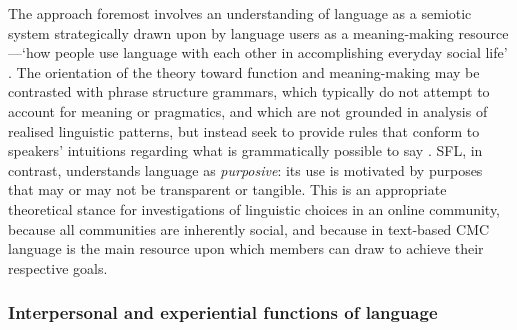 The  approach foremost involves an understanding of language as a semiotic system strategically drawn upon by language users as a meaning\hyp{}making resource---`how people use language with each other in accomplishing everyday social life' \cite[p.~2]{eggins_introduction_2004}. The orientation of the theory toward function and meaning\hyp{}making may be contrasted with phrase structure grammars, which typically do not attempt to account for meaning or pragmatics, and which are not grounded in analysis of realised linguistic patterns, but instead seek to provide rules that conform to speakers' intuitions regarding what is grammatically possible to say \cite{martin_english_1992}. \gls{SFL}, in contrast, understands language as \emph{purposive}: its use is motivated by purposes that may or may not be transparent or tangible. This is an appropriate theoretical stance for investigations of linguistic choices in an online community, because all communities are inherently social, and because in text\hyp{}based \gls{CMC} language is the main resource upon which members can draw to achieve their respective goals.


\subsubsection{Interpersonal and experiential functions of language}

